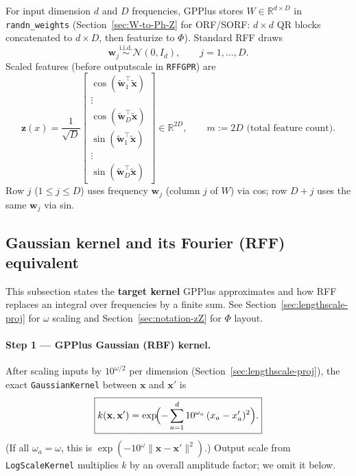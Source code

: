 \documentclass[11pt]{article}
\newcommand{\Ph}{\Phi}
\begin{document}
For input dimension $d$ and $D$ frequencies, GPPlus stores $W\in\mathbb{R}^{d\times D}$ in \texttt{randn\_weights}
(Section~\ref{sec:W-to-Ph-Z} for ORF/SORF: $d\times d$ QR blocks concatenated to $d\times D$, then featurize to $\Ph$).
Standard RFF draws
\begin{equation}
  \label{eq:rff-iid}
  \mathbf w_j \stackrel{\text{i.i.d.}}{\sim} \mathcal N(0, I_d),
  \qquad j=1,\ldots,D.
\end{equation}
Scaled features (before outputscale in \texttt{RFFGPR}) are
\begin{equation}
  \label{eq:featurize}
  \mathbf z(x)
  = \frac{1}{\sqrt{D}}
  \begin{bmatrix}
    \cos(\tilde{\mathbf w}_1^{\top}\tilde{\mathbf x}) \\
    \vdots \\
    \cos(\tilde{\mathbf w}_D^{\top}\tilde{\mathbf x}) \\
    \sin(\tilde{\mathbf w}_1^{\top}\tilde{\mathbf x}) \\
    \vdots \\
    \sin(\tilde{\mathbf w}_D^{\top}\tilde{\mathbf x})
  \end{bmatrix}
  \in \mathbb{R}^{2D},
  \qquad m := 2D \text{ (total feature count)}.
\end{equation}
Row $j$ ($1\le j\le D$) uses frequency $\mathbf w_j$ (column $j$ of $W$) via cos; row $D+j$ uses the same $\mathbf w_j$ via sin.

\subsection{Gaussian kernel and its Fourier (RFF) equivalent}
\label{sec:gaussian-fourier}

This subsection states the \textbf{target kernel} GPPlus approximates and how RFF replaces an integral over frequencies by a finite sum.
See Section~\ref{sec:lengthscale-proj} for $\omega$ scaling and Section~\ref{sec:notation-zZ} for $\Ph$ layout.

\paragraph{Step 1 --- GPPlus Gaussian (RBF) kernel.}
After scaling inputs by $10^{\omega/2}$ per dimension (Section~\ref{sec:lengthscale-proj}), the exact
\texttt{GaussianKernel} between $\mathbf x$ and $\mathbf x'$ is
\begin{equation}
  \label{eq:gpplus-rbf}
  \boxed{
  k(\mathbf x,\mathbf x')
  = \exp\!\Bigl(-\sum_{a=1}^{d} 10^{\omega_a}\,(x_a-x'_a)^2\Bigr).
  }
\end{equation}
(If all $\omega_a=\omega$, this is $\exp(-10^{\omega}\|\mathbf x-\mathbf x'\|^2)$.)
Output scale from \texttt{LogScaleKernel} multiplies $k$ by an overall amplitude factor; we omit it below.
\end{document}
